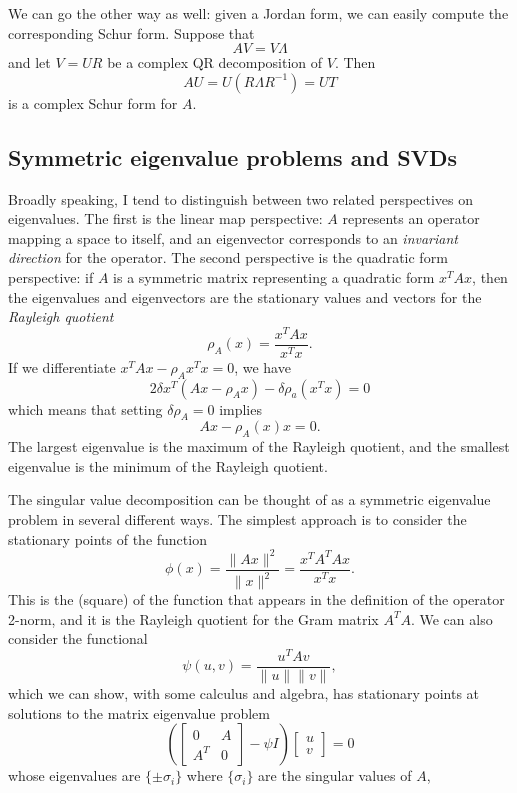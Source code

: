 \documentclass[12pt, leqno]{article}
\begin{document}
We can go the other way as well: given a Jordan form, we can
easily compute the corresponding Schur form.  Suppose that
\[
  AV = V \Lambda
\]
and let $V = UR$ be a complex QR decomposition of $V$.  Then
\[
  AU = U (R \Lambda R^{-1}) = UT
\]
is a complex Schur form for $A$.

\subsection{Symmetric eigenvalue problems and SVDs}

Broadly speaking, I tend to distinguish between two related
perspectives on eigenvalues.  The first is the linear map
perspective: $A$ represents an operator mapping a space to itself,
and an eigenvector corresponds to an {\em invariant direction}
for the operator.  The second perspective is the quadratic form
perspective: if $A$ is a symmetric matrix representing a quadratic
form $x^T A x$, then the eigenvalues and eigenvectors are the
stationary values and vectors for the {\em Rayleigh quotient}
\[
  \rho_A(x) = \frac{x^T A x}{x^T x}.
\]
If we differentiate $x^T A x - \rho_A x^T x = 0$, we have
\[
  2 \delta x^T (Ax - \rho_A x) - \delta \rho_a (x^T x) = 0
\]
which means that setting $\delta \rho_A = 0$ implies
\[
  Ax-\rho_A(x) x = 0.
\]
The largest eigenvalue is the maximum of the Rayleigh quotient,
and the smallest eigenvalue is the minimum of the Rayleigh quotient.

The singular value decomposition can be thought of as a symmetric
eigenvalue problem in several different ways.  The simplest approach
is to consider the stationary points of the function
\[
  \phi(x) = \frac{\|Ax\|^2}{\|x\|^2} = \frac{x^T A^T A x}{x^T x}.
\]
This is the (square) of the function that appears in the definition of
the operator 2-norm, and it is the Rayleigh quotient for the Gram
matrix $A^T A$.  We can also consider the functional
\[
  \psi(u,v) = \frac{u^T A v}{\|u\| \|v\|},
\]
which we can show, with some calculus and algebra,
has stationary points at solutions to the matrix eigenvalue problem
\[
\left( \begin{bmatrix} 0 & A \\ A^T & 0 \end{bmatrix} - \psi I \right)
\begin{bmatrix} u \\ v \end{bmatrix} = 0
\]
whose eigenvalues are $\{ \pm \sigma_i \}$ where $\{ \sigma_i \}$
are the singular values of $A$, 
\end{document}
